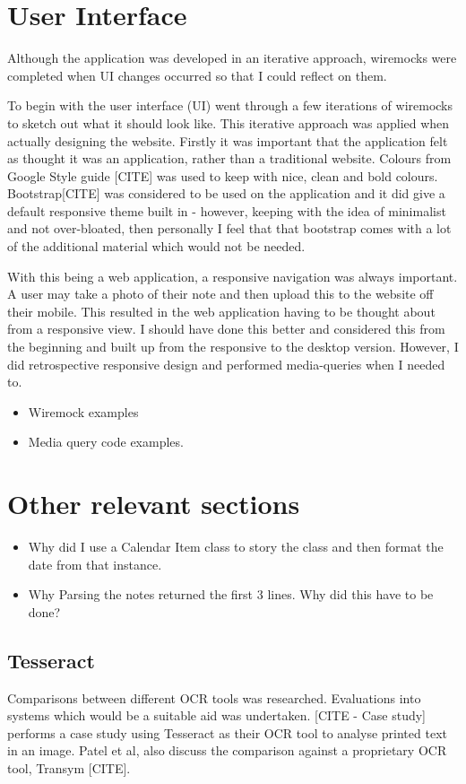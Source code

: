 \section{User Interface}
Although the application was developed in an iterative approach, wiremocks were completed when UI changes occurred so that I could reflect on them.

To begin with the user interface (UI) went through a few iterations of wiremocks to sketch out what it should look like.  This iterative approach was applied when actually designing the website. Firstly it was important that the application felt as thought it was an application, rather than a traditional website. Colours from Google Style guide [CITE] was used to keep with nice, clean and bold colours. Bootstrap[CITE] was considered to be used on the application and it did give a default responsive theme built in - however, keeping with the idea of minimalist and not over-bloated, then personally I feel that that bootstrap comes with a lot of the additional material which would not be needed.

With this being a web application, a responsive navigation was always important. A user may take a photo of their note and then upload this to the website off their mobile. This resulted in the web application having to be thought about from a responsive view. I should have done this better and considered this from the beginning and built up from the responsive to the desktop version. However, I did retrospective responsive design and performed media-queries when I needed to.
\begin{itemize}
  \item Wiremock examples
  \item Media query code examples.
\end{itemize}
\section{Other relevant sections}
\begin{itemize}
  \item Why did I use a Calendar Item class to story the class and then format the date from that instance.
  \item Why Parsing the notes returned the first 3 lines. Why did this have to be done?

\end{itemize}

\subsection{Tesseract}
Comparisons between different OCR tools was researched. Evaluations into systems which would be a suitable aid was undertaken. [CITE - Case study] performs a case study using Tesseract as their OCR tool to analyse printed text in an image. Patel et al, also discuss the comparison against a proprietary OCR tool, Transym [CITE].

